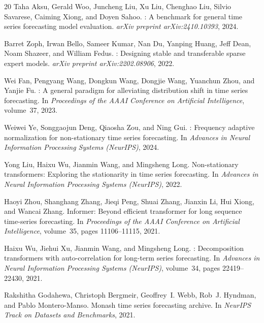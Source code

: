\documentclass{article}
\begin{document}
\begin{thebibliography}{20}
Taha Aksu, Gerald Woo, Juncheng Liu, Xu Liu, Chenghao Liu, Silvio Savarese, Caiming Xiong, and Doyen Sahoo.
: A benchmark for general time series forecasting model evaluation.
\newblock \textit{arXiv preprint arXiv:2410.10393}, 2024.

Barret Zoph, Irwan Bello, Sameer Kumar, Nan Du, Yanping Huang, Jeff Dean, Noam Shazeer, and William Fedus.
: Designing stable and transferable sparse expert models.
\newblock \textit{arXiv preprint arXiv:2202.08906}, 2022.

Wei Fan, Pengyang Wang, Dongkun Wang, Dongjie Wang, Yuanchun Zhou, and Yanjie Fu.
: A general paradigm for alleviating distribution shift in time series forecasting.
\newblock In \textit{Proceedings of the AAAI Conference on Artificial Intelligence}, volume~37, 2023.

Weiwei Ye, Songgaojun Deng, Qiaosha Zou, and Ning Gui.
: Frequency adaptive normalization for non-stationary time series forecasting.
\newblock In \textit{Advances in Neural Information Processing Systems (NeurIPS)}, 2024.

Yong Liu, Haixu Wu, Jianmin Wang, and Mingsheng Long.
\newblock Non-stationary transformers: Exploring the stationarity in time series forecasting.
\newblock In \textit{Advances in Neural Information Processing Systems (NeurIPS)}, 2022.

Haoyi Zhou, Shanghang Zhang, Jieqi Peng, Shuai Zhang, Jianxin Li, Hui Xiong, and Wancai Zhang.
\newblock Informer: Beyond efficient transformer for long sequence time-series forecasting.
\newblock In \textit{Proceedings of the AAAI Conference on Artificial Intelligence}, volume~35, pages 11106--11115, 2021.

Haixu Wu, Jiehui Xu, Jianmin Wang, and Mingsheng Long.
: Decomposition transformers with auto-correlation for long-term series forecasting.
\newblock In \textit{Advances in Neural Information Processing Systems (NeurIPS)}, volume~34, pages 22419--22430, 2021.

Rakshitha Godahewa, Christoph Bergmeir, Geoffrey~I. Webb, Rob~J. Hyndman, and Pablo Montero-Manso.
\newblock Monash time series forecasting archive.
\newblock In \textit{NeurIPS Track on Datasets and Benchmarks}, 2021.


\end{thebibliography}
\end{document}
